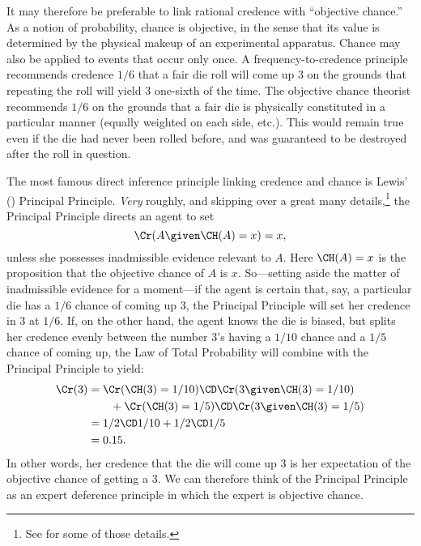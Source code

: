 It may therefore be preferable to link rational credence with ``objective chance.'' As a notion of probability, chance is objective, in the sense that its value is determined by the physical makeup of an experimental apparatus. Chance may also be applied to events that occur only once. A frequency-to-credence principle recommends credence $1/6$ that a fair die roll will come up $3$ on the grounds that repeating the roll will yield $3$ one-sixth of the time. The objective chance theorist recommends $1/6$ on the grounds that a fair die is physically constituted in a particular manner (equally weighted on each side, etc.). This would remain true even if the die had never been rolled before, and was guaranteed to be destroyed after the roll in question.

The most famous direct inference principle linking credence and chance is Lewis' (\citeyear{LewisASGTOC}) Principal Principle. \emph{Very} roughly, and skipping over a great many details,\footnote
{See \citet{MeachamPrincipal} for some of those details.}
the Principal Principle directs an agent to set 
\begin{equation}
\Cr(A \given \CH(A)=x)=x,
\end{equation}
unless she possesses inadmissible evidence relevant to $A$. Here $\CH(A)=x$ is the proposition that the objective chance of $A$ is $x$. So---setting aside the matter of inadmissible evidence for a moment---if the agent is certain that, say, a particular die has a $1/6$ chance of coming up $3$, the Principal Principle will set her credence in $3$ at $1/6$. If, on the other hand, the agent knows the die is biased, but splits her credence evenly between the number $3$'s having a $1/10$ chance and a $1/5$ chance of coming up, the Law of Total Probability will combine with the Principal Principle to yield:
\begin{equation}
\begin{aligned}
\Cr(3) &= \Cr(\CH(3)=1/10) \CD \Cr(3 \given \CH(3)=1/10)\\
	   &\qquad +\Cr(\CH(3)=1/5) \CD \Cr(3 \given \CH(3)=1/5)\\
	   &= 1/2 \CD 1/10 + 1/2 \CD 1/5\\
	   &= 0.15.
\end{aligned}
\end{equation}
In other words, her credence that the die will come up $3$ is her expectation of the objective chance of getting a $3$. We can therefore think of the Principal Principle as an expert deference principle in which the expert is objective chance.

